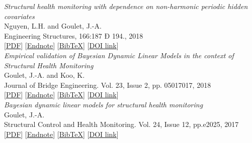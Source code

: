\noindent \emph{Structural health monitoring with dependence on non-harmonic periodic hidden covariates}\\{\small
            Nguyen, L.H. and Goulet, J.-A.\\
            Engineering Structures, 166:187 Ð 194., 2018\\}
      [\href{https://www.polymtl.ca/cgm/jagoulet/Site/Papers/2018_Nguyen_et_Goulet_SHMHNHC.pdf}{PDF}] [\href{https://www.polymtl.ca/cgm/jagoulet/Site/Papers/2018_Nguyen_et_Goulet_HNHC.xml}{Endnote}]  [\href{https://www.polymtl.ca/cgm/jagoulet/Site/Papers/2018_Nguyen_et_Goulet_HNHC.bib}{BibTeX}] [\href{https://doi.org/10.1016/j.engstruct.2018.03.080}{DOI link}] \cite{Nguyen2018187}\\[4pt]

\noindent \emph{Empirical validation of Bayesian Dynamic Linear Models in the context of Structural Health Monitoring}\\{\small
            Goulet, J.-A. and Koo, K.\\
            Journal of Bridge Engineering. Vol. 23, Issue 2, pp. 05017017, 2018\\}
      [\href{https://www.polymtl.ca/cgm/jagoulet/Site/Papers/Goulet_BDLM_tamar_2017.pdf}{PDF}] [\href{https://www.polymtl.ca/cgm/jagoulet/Site/Papers/Goulet_BDLM_2018.xml}{Endnote}]  [\href{https://www.polymtl.ca/cgm/jagoulet/Site/Papers/Goulet_BDLM_2018.ris}{BibTeX}] [\href{https://doi.org/10.1061/\%28ASCE\%29BE.1943-5592.0001190}{DOI link}] \cite{Goulet2017BDLMEmprical}\\[4pt]

\noindent \emph{Bayesian dynamic linear models for structural health monitoring}\\{\small
            Goulet, J.-A.\\
            Structural Control and Health Monitoring. Vol. 24, Issue 12, pp.e2025, 2017\\}
      [\href{https://www.polymtl.ca/cgm/jagoulet/Site/Papers/Goulet_BDLM_SHM_2017_preprint.pdf}{PDF}] [\href{https://www.polymtl.ca/cgm/jagoulet/Site/Papers/Goulet_BDLM_2017.xml}{Endnote}]  [\href{https://www.polymtl.ca/cgm/jagoulet/Site/Papers/Goulet_BDLM_2017.ris}{BibTeX}] [\href{https://doi.org/10.1002/stc.2035}{DOI link}] \cite{STC:STC2035} \\

 
